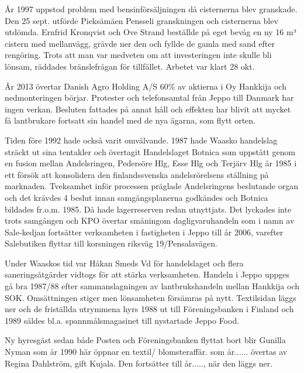 
År 1997 uppstod problem med bensinförsäljningen då cisternerna blev granskade. Den 25 sept. utförde Pieksämäen Pensseli granskningen och cisternerna blev utdömda. Ernfrid Kronqvist och Ove Strand beställde på eget bevåg en ny 16 m³ cistern med mellanvägg, grävde ner den och fyllde de gamla med sand efter rengöring. Trots att man var medveten om att investeringen inte skulle bli lönsam, räddades bränslefrågan för tillfället. Arbetet var klart 28 okt.

År 2013 övertar Danish Agro Holding A/S 60\% av aktierna i Oy Hankkija  och nedmonteringen börjar. Protester och telefonsamtal från Jeppo till Danmark har ingen verkan. Besluten fattades på annat håll och effekten har blivit att mycket få lantbrukare fortsatt sin handel med de nya ägarna, som flytt orten.


Tiden före 1992 hade också varit omvälvande. 1987 hade Waasko handelslag sträckt ut sina tentakler och övertagit Handelslaget Botnica som uppstått genom en fusion mellan Andelsringen, Pedersöre Hlg, Esse Hlg och Terjärv Hlg år 1985 i ett försök att konsolidera den finlandssvenska andelsrörelsens ställning på marknaden. Tveksamhet inför processen präglade Andelsringens beslutande organ och det krävdes 4 beslut innan samgångsplanerna godkändes och Botnica bildades fr.o.m. 1985. Då hade lagerreserven redan utnyttjats. Det lyckades inte trots samgången och KPO övertar småningom dagligvaruhandeln som i namn av Sale-kedjan fortsätter verksamheten i fastigheten i Jeppo till år 2006, varefter Salebutiken flyttar till korsningen riksväg 19/Pensalavägen.


Under Waaskos tid var Håkan Smeds Vd för handelslaget och flera saneringsåtgärder vidtogs för att stärka verksamheten. Handeln i Jeppo uppges gå bra 1987/88 efter sammanslagningen av lantbrukshandeln mellan Hankkija och SOK. Omsättningen stiger men lönsamheten försämras på nytt. Textilsidan läggs ner och de friställda utrymmena hyrs 1988 ut till Föreningsbanken i Finland och 1989 såldes bl.a. spannmålsmagasinet till nystartade Jeppo Food.

Ny hyresgäst sedan både Posten och Föreningsbanken flyttat bort blir Gunilla Nyman som år 1990 här öppnar en textil/ blomsteraffär. som år...... övertas av Regina Dahlström, gift Kujala. Den fortsätter till år....., när den läggs ner.

